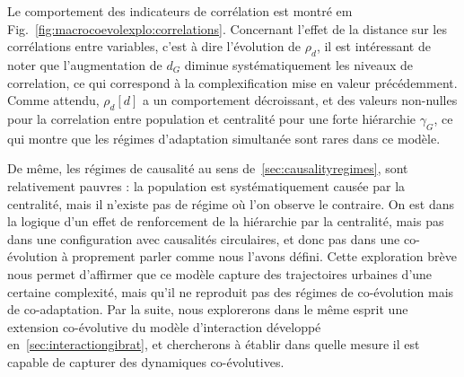 Le comportement des indicateurs de corrélation est montré em Fig.~\ref{fig:macrocoevolexplo:correlations}. Concernant l'effet de la distance sur les corrélations entre variables, c'est à dire l'évolution de $\rho_d$, il est intéressant de noter que l'augmentation de $d_G$ diminue systématiquement les niveaux de correlation, ce qui correspond à la complexification mise en valeur précédemment. Comme attendu, $\rho_d\left[d\right]$ a un comportement décroissant, et des valeurs non-nulles pour la correlation entre population et centralité pour une forte hiérarchie $\gamma_G$, ce qui montre que les régimes d'adaptation simultanée sont rares dans ce modèle.


De même, les régimes de causalité au sens de~\ref{sec:causalityregimes}, sont relativement pauvres : la population est systématiquement causée par la centralité, mais il n'existe pas de régime où l'on observe le contraire. On est dans la logique d'un effet de renforcement de la hiérarchie par la centralité, mais pas dans une configuration avec causalités circulaires, et donc pas dans une co-évolution à proprement parler comme nous l'avons défini. Cette exploration brève nous permet d'affirmer que ce modèle capture des trajectoires urbaines d'une certaine complexité, mais qu'il ne reproduit pas des régimes de co-évolution mais de co-adaptation. Par la suite, nous explorerons dans le même esprit une extension co-évolutive du modèle d'interaction développé en~\ref{sec:interactiongibrat}, et chercherons à établir dans quelle mesure il est capable de capturer des dynamiques co-évolutives.





